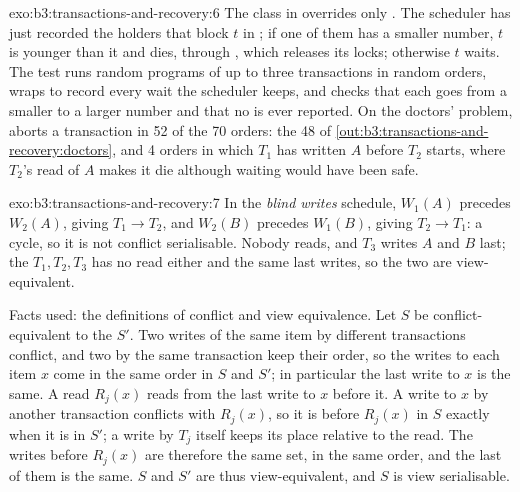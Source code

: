 \begin{solution}{exo:b3:transactions-and-recovery:6}
The class in  overrides only . The scheduler has just recorded the holders that block $t$ in ; if one of them has a smaller number, $t$ is younger than it and dies, through , which releases its locks; otherwise $t$ waits. The test runs random programs of up to three transactions in random orders, wraps  to record every wait the scheduler keeps, and checks that each goes from a smaller to a larger number and that no  is ever reported. On the doctors' problem,  aborts a transaction in 52 of the 70 orders: the 48  of \cref{out:b3:transactions-and-recovery:doctors}, and 4 orders in which $T_1$ has written $A$ before $T_2$ starts, where $T_2$'s read of $A$ makes it die although waiting would have been safe.
\end{solution}

\begin{solution}{exo:b3:transactions-and-recovery:7}
In the \emph{blind writes} schedule, $W_1(A)$ precedes $W_2(A)$, giving $T_1 \to T_2$, and $W_2(B)$ precedes $W_1(B)$, giving $T_2 \to T_1$: a cycle, so it is not conflict serialisable. Nobody reads, and $T_3$ writes $A$ and $B$ last; the  $T_1, T_2, T_3$ has no read either and the same last writes, so the two are view-equivalent.

Facts used: the definitions of conflict and view equivalence. Let $S$ be conflict-equivalent to the  $S'$. Two writes of the same item by different transactions conflict, and two by the same transaction keep their order, so the writes to each item $x$ come in the same order in $S$ and $S'$; in particular the last write to $x$ is the same. A read $R_j(x)$ reads from the last write to $x$ before it. A write to $x$ by another transaction conflicts with $R_j(x)$, so it is before $R_j(x)$ in $S$ exactly when it is in $S'$; a write by $T_j$ itself keeps its place relative to the read. The writes before $R_j(x)$ are therefore the same set, in the same order, and the last of them is the same. $S$ and $S'$ are thus view-equivalent, and $S$ is view serialisable.
\end{solution}


